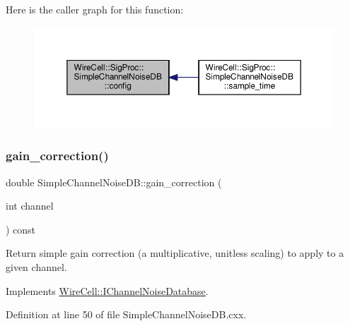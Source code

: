 Here is the caller graph for this function\+:
\nopagebreak
\begin{figure}[H]
\begin{center}
\leavevmode
\includegraphics[width=350pt]{class_wire_cell_1_1_sig_proc_1_1_simple_channel_noise_d_b_a3eabaf3d48c127aaa6c594c682e6a77a_icgraph}
\end{center}
\end{figure}
\mbox{\label{class_wire_cell_1_1_sig_proc_1_1_simple_channel_noise_d_b_a7b4f5283401aa1668adda46ba52b06c6}} 
\subsubsection{\texorpdfstring{gain\+\_\+correction()}{gain\_correction()}}
{\footnotesize\ttfamily double Simple\+Channel\+Noise\+D\+B\+::gain\+\_\+correction (\begin{DoxyParamCaption}\item[{int}]{channel }\end{DoxyParamCaption}) const\hspace{0.3cm}{\ttfamily [virtual]}}

Return simple gain correction (a multiplicative, unitless scaling) to apply to a given channel. 

Implements \hyperlink{class_wire_cell_1_1_i_channel_noise_database_ad2cdf46aea4ac11f8b7d097bd19c2e80}{Wire\+Cell\+::\+I\+Channel\+Noise\+Database}.



Definition at line 50 of file Simple\+Channel\+Noise\+D\+B.\+cxx.

